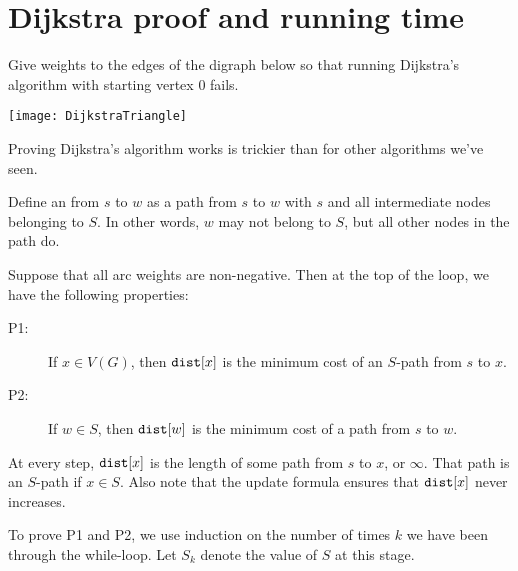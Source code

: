 \chapter{Dijkstra proof and running time} %
\begin{Boxample}[0.5] \label{ex:dijk-neg-fails}
Give weights to the edges of the digraph below so that running Dijkstra's algorithm 
with starting vertex $0$ fails. 
\vspace{0.5cm} 
\begin{center}
  \texttt{[image: DijkstraTriangle]}
\end{center}
\end{Boxample}

Proving Dijkstra's algorithm works is trickier than for other algorithms we've seen.

Define an  from $s$ to $w$ as a
path from $s$ to $w$ with $s$ and all intermediate nodes belonging to $S$. 
In other words, $w$ may not belong to $S$, but all other nodes in the path do.

\begin{Theorem}
\label{thm:dijkstra} Suppose that all arc weights are non-negative. 
Then at the top of the  loop, we have the following properties:
\begin{description}
  \item[P1:] If $x \in V(G)$, then $\operatorname{\text{\texttt{dist}}}[x]$ is the minimum cost of an $S$-path from $s$ to $x$.
  \item[P2:] If $w \in S$, then $\operatorname{\text{\texttt{dist}}}[w]$ is the minimum cost of a path from $s$ to $w$.
\end{description}
\end{Theorem}
At every step, $\operatorname{\text{\texttt{dist}}}[x]$ is the length of some path from $s$ to $x$, or $\infty$. 
That path is an $S$-path if $x \in S$. 
Also note that the update formula ensures that $\operatorname{\text{\texttt{dist}}}[x]$ never increases. 

To prove P1 and P2, we use induction on the number of times $k$ we
have been through the while-loop. Let $S_k$ denote the value of $S$
at this stage. 

